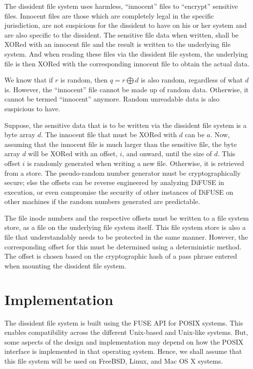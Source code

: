 \documentclass[10pt,twocolumn]{article}
\begin{document}
The dissident file system uses harmless, ``innocent'' files to ``encrypt'' sensitive files. Innocent files are those which are completely legal in the specific jurisdiction, are not suspicious for the dissident to have on his or her system and are also specific to the dissident. The sensitive file data when written, shall be XORed with an innocent file and the result is written to the underlying file system. And when reading these files via the dissident file system, the underlying file is then XORed with the corresponding innocent file to obtain the actual data.

We know that if $\mathit{r}$ is random, then $\mathit{q = r \bigoplus d}$ is also random, regardless of what $\mathit{d}$ is. However, the ``innocent'' file cannot be made up of random data. Otherwise, it cannot be termed “innocent” anymore. Random unreadable data is also suspicious to have.

Suppose, the sensitive data that is to be written via the dissident file system is a byte array $d$. The innocent file that must be XORed with $d$ can be $a$. Now, assuming that the innocent file is much larger than the sensitive file, the byte array $d$ will be XORed with an offset, $i$, and onward, until the size of $d$. This offset $i$ is randomly generated when writing a new file. Otherwise, it is retrieved from a store. The pseudo-random number generator must be cryptographically secure; else the offsets can be reverse engineered by analyzing DiFUSE in execution, or even compromise the security of other instances of DiFUSE on other machines if the random numbers generated are predictable.

The file inode numbers and the respective offsets must be written to a file system store, as a file on the underlying file system itself. This file system store is also a file that understandably needs to be protected in the same manner. However, the corresponding offset for this must be determined using a deterministic method. The offset is chosen based on the cryptographic hash of a pass phrase entered when mounting the dissident file system.

\section{Implementation}

The dissident file system is built using the FUSE API for POSIX systems. This enables compatibility across the different Unix-based and Unix-like systems. But, some aspects of the design and implementation may depend on how the POSIX interface is implemented in that operating system. Hence, we shall assume that this file system will be used on FreeBSD, Linux, and Mac OS X systems.
\end{document}

